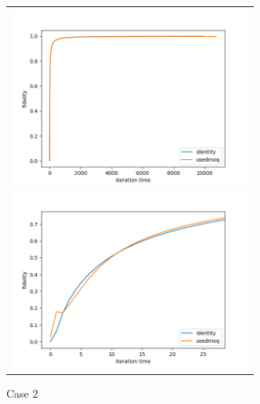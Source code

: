 \documentclass[11pt,a4j,notitlepage]{jreport}
\begin{document}
	\begin{figure}[htbp]
	\centering
		\begin{tabular}{c}
	  
			\begin{minipage}{0.5\hsize}
			\begin{center}
				\includegraphics[clip, width=8cm]{./picture/fpall.png}
			\end{center}
			\end{minipage}
	  
			\begin{minipage}{0.5\hsize}
			\begin{center}
				\includegraphics[clip, width=8cm]{./picture/fpallextended.png}
			\end{center}
			\end{minipage}
			
		\end{tabular}
		\caption{Case 2}
	\end{figure}

	\newpage
\end{document}
